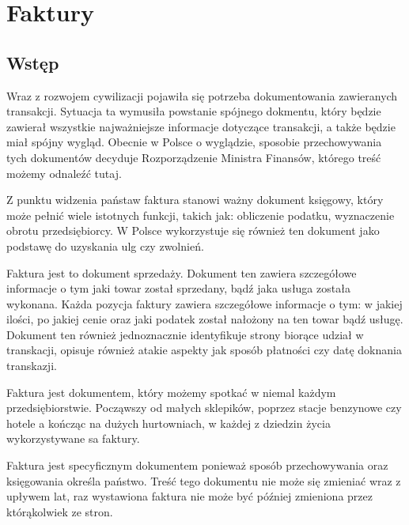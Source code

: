

\section{Faktury}
\subsection{Wstęp}
Wraz z rozwojem cywilizacji pojawiła się potrzeba dokumentowania zawieranych
transakcji. Sytuacja ta wymusiła powstanie spójnego dokmentu, który będzie
zawierał wszystkie najważniejsze informacje dotyczące transakcji, a także będzie
miał spójny wygląd. Obecnie w Polsce o wyglądzie, sposobie przechowywania tych
dokumentów decyduje Rozporządzenie Ministra
Finansów, którego treść możemy odnaleźć tutaj\cite{RozporzadzenieFaktury}.

Z punktu widzenia państaw faktura stanowi ważny dokument księgowy, który może
pełnić wiele istotnych funkcji, takich jak: obliczenie podatku,
wyznaczenie obrotu przedsiębiorcy. W Polsce wykorzystuje się również ten
dokument jako podstawę do uzyskania ulg czy zwolnień.



Faktura jest to dokument sprzedaży. Dokument ten zawiera szczegółowe informacje
o tym jaki towar został sprzedany, bądź jaka usługa została wykonana. Każda
pozycja faktury zawiera szczegółowe informacje o tym: w jakiej
ilości, po jakiej cenie oraz jaki podatek został nałożony na ten towar bądź
usługę.
Dokument ten również jednoznacznie identyfikuje strony biorące udział w
transkacji, opisuje również atakie aspekty jak sposób płatności czy datę
doknania transkazji.

Faktura jest dokumentem, który możemy spotkać w niemal każdym przedsiębiorstwie.
Począwszy od małych sklepików, poprzez stacje benzynowe czy hotele a kończąc na dużych
hurtowniach, w każdej z dziedzin życia wykorzystywane sa faktury.

Faktura jest specyficznym dokumentem ponieważ sposób
przechowywania oraz księgowania określa państwo. Treść tego dokumentu nie
może się zmieniać wraz z upływem lat, raz wystawiona faktura nie może być
później zmieniona przez którąkolwiek ze stron. 

